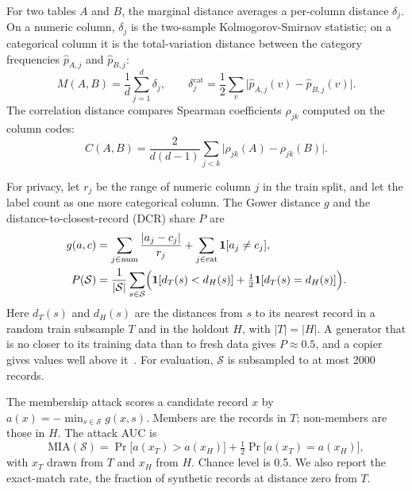 \documentclass[journal]{IEEEtran}
\begin{document}
For two tables $A$ and $B$, the marginal distance averages a per-column distance $\delta_j$. On a numeric column, $\delta_j$ is the two-sample Kolmogorov-Smirnov statistic; on a categorical column it is the total-variation distance between the category frequencies $\hat p_{A,j}$ and $\hat p_{B,j}$:
\begin{equation}
M(A,B)=\frac{1}{d}\sum_{j=1}^{d}\delta_j,\qquad \delta_j^{\mathrm{cat}}=\frac{1}{2}\sum_{v}\bigl|\hat p_{A,j}(v)-\hat p_{B,j}(v)\bigr|.
\label{eq:marginal}
\end{equation}
The correlation distance compares Spearman coefficients $\rho_{jk}$ computed on the column codes:
\begin{equation}
C(A,B)=\frac{2}{d(d-1)}\sum_{j<k}\bigl|\rho_{jk}(A)-\rho_{jk}(B)\bigr|.
\label{eq:corr}
\end{equation}

For privacy, let $r_j$ be the range of numeric column $j$ in the train split, and let the label count as one more categorical column. The Gower distance $g$ and the distance-to-closest-record (DCR) share $P$ are
\begin{equation}
\begin{split}
g(a,c)&=\sum_{j\in\mathrm{num}}\frac{|a_j-c_j|}{r_j}+\sum_{j\in\mathrm{cat}}\mathbf{1}[a_j\neq c_j],\\
P(\mathcal{S})&=\frac{1}{|\mathcal{S}|}\sum_{s\in\mathcal{S}}\Bigl(\mathbf{1}[d_T(s)<d_H(s)]+\tfrac{1}{2}\mathbf{1}[d_T(s)=d_H(s)]\Bigr).
\end{split}
\label{eq:dcr}
\end{equation}
Here $d_T(s)$ and $d_H(s)$ are the distances from $s$ to its nearest record in a random train subsample $T$ and in the holdout $H$, with $|T|=|H|$. A generator that is no closer to its training data than to fresh data gives $P\approx 0.5$, and a copier gives values well above it~\cite{platzer2021holdout}. For evaluation, $\mathcal{S}$ is subsampled to at most 2000 records.

The membership attack scores a candidate record $x$ by $a(x)=-\min_{s\in\mathcal{S}}g(x,s)$. Members are the records in $T$; non-members are those in $H$. The attack AUC is
\begin{equation}
\mathrm{MIA}(\mathcal{S})=\Pr\bigl[a(x_T)>a(x_H)\bigr]+\tfrac{1}{2}\Pr\bigl[a(x_T)=a(x_H)\bigr],
\label{eq:mia}
\end{equation}
with $x_T$ drawn from $T$ and $x_H$ from $H$. Chance level is 0.5. We also report the exact-match rate, the fraction of synthetic records at distance zero from $T$.
\end{document}
